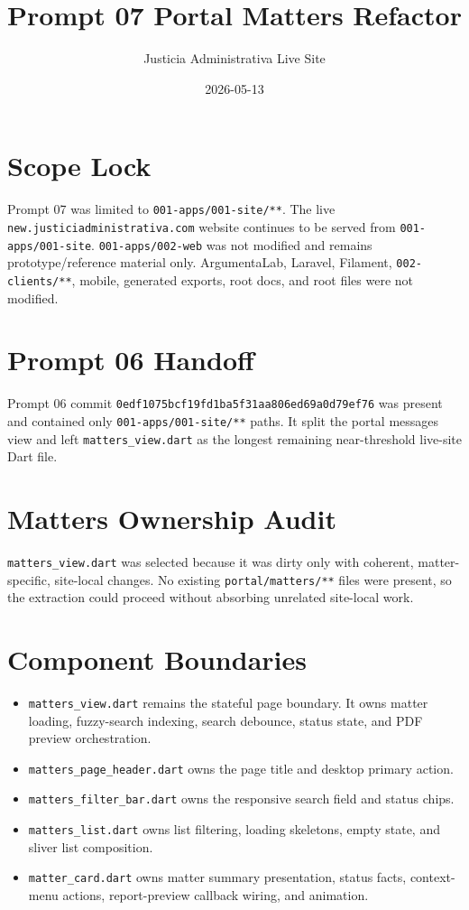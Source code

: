 \documentclass[11pt]{article}
\title{Prompt 07 Portal Matters Refactor}
\author{Justicia Administrativa Live Site}
\date{2026-05-13}
\begin{document}
\maketitle

\section*{Scope Lock}
Prompt 07 was limited to \texttt{001-apps/001-site/**}. The live
\texttt{new.justiciadministrativa.com} website continues to be served from
\texttt{001-apps/001-site}. \texttt{001-apps/002-web} was not modified and
remains prototype/reference material only. ArgumentaLab, Laravel, Filament,
\texttt{002-clients/**}, mobile, generated exports, root docs, and root files
were not modified.

\section*{Prompt 06 Handoff}
Prompt 06 commit
\texttt{0edf1075bcf19fd1ba5f31aa806ed69a0d79ef76} was present and contained
only \texttt{001-apps/001-site/**} paths. It split the portal messages view and
left \texttt{matters\_view.dart} as the longest remaining near-threshold
live-site Dart file.

\section*{Matters Ownership Audit}
\texttt{matters\_view.dart} was selected because it was dirty only with
coherent, matter-specific, site-local changes. No existing
\texttt{portal/matters/**} files were present, so the extraction could proceed
without absorbing unrelated site-local work.

\section*{Component Boundaries}
\begin{itemize}
  \item \texttt{matters\_view.dart} remains the stateful page boundary. It owns
  matter loading, fuzzy-search indexing, search debounce, status state, and PDF
  preview orchestration.
  \item \texttt{matters\_page\_header.dart} owns the page title and desktop
  primary action.
  \item \texttt{matters\_filter\_bar.dart} owns the responsive search field and
  status chips.
  \item \texttt{matters\_list.dart} owns list filtering, loading skeletons,
  empty state, and sliver list composition.
  \item \texttt{matter\_card.dart} owns matter summary presentation, status
  facts, context-menu actions, report-preview callback wiring, and animation.
\end{itemize}
\end{document}
